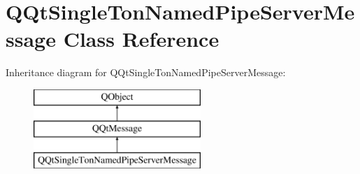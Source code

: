 \hypertarget{class_q_qt_single_ton_named_pipe_server_message}{}\section{Q\+Qt\+Single\+Ton\+Named\+Pipe\+Server\+Message Class Reference}
\label{class_q_qt_single_ton_named_pipe_server_message}
Inheritance diagram for Q\+Qt\+Single\+Ton\+Named\+Pipe\+Server\+Message\+:\begin{figure}[H]
\begin{center}
\leavevmode
\includegraphics[height=3.000000cm]{class_q_qt_single_ton_named_pipe_server_message}
\end{center}
\end{figure}
